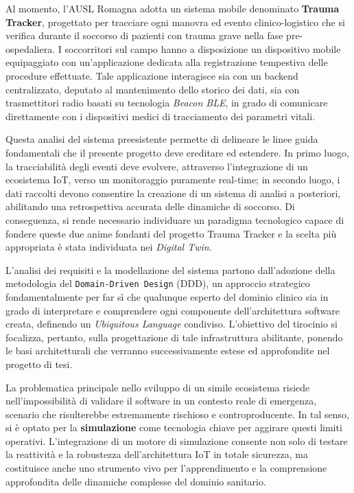 \documentclass[12pt,a4paper,oneside]{article}
\begin{document}
Al momento, l'AUSL Romagna adotta un sistema mobile denominato 
\textbf{Trauma Tracker}, progettato per tracciare ogni manovra ed evento clinico-logistico 
che si verifica durante il soccorso di pazienti con trauma grave nella fase
pre-ospedaliera. I soccorritori sul campo hanno a disposizione un dispositivo
mobile equipaggiato con un'applicazione dedicata alla registrazione tempestiva
delle procedure effettuate. Tale applicazione interagisce sia con un backend
centralizzato, deputato al mantenimento dello storico dei dati, sia con
trasmettitori radio basati su tecnologia \textit{Beacon BLE}, in grado di
comunicare direttamente con i dispositivi medici di tracciamento dei parametri
vitali.

Questa analisi del sistema preesistente permette di delineare le linee
guida fondamentali che il presente progetto deve ereditare ed estendere. In primo
luogo, la tracciabilità degli eventi deve evolvere, attraverso l'integrazione
di un ecosistema IoT, verso un monitoraggio puramente real-time; in secondo
luogo, i dati raccolti devono consentire la creazione di un sistema di analisi
a posteriori, abilitando una retrospettiva accurata delle dinamiche di soccorso.
Di conseguenza, si rende necessario individuare un paradigma tecnologico capace
di fondere queste due anime fondanti del progetto Trauma Tracker e la scelta più
appropriata è stata individuata nei \textit{Digital Twin}.

L'analisi dei requisiti e la modellazione del sistema partono dall'adozione
della metodologia del \texttt{Domain-Driven Design} (DDD), un approccio strategico
fondamentalmente per far sì che qualunque esperto del dominio clinico sia
in grado di interpretare e comprendere ogni componente dell'architettura
software creata, definendo un \textit{Ubiquitous Language} condiviso.
L'obiettivo del tirocinio si focalizza, pertanto,
sulla progettazione di tale infrastruttura abilitante, ponendo le basi
architetturali che verranno successivamente estese ed
approfondite nel progetto di tesi.

La problematica principale nello sviluppo di un simile ecosistema risiede
nell'impossibilità di validare il software in un contesto reale di emergenza, 
scenario che risulterebbe estremamente rischioso e controproducente. In tal senso, 
si è optato per la \textbf{simulazione} come tecnologia chiave per aggirare questi 
limiti operativi. L'integrazione di un motore di simulazione consente non solo di 
testare la reattività e la robustezza dell'architettura IoT in totale sicurezza, 
ma costituisce anche uno strumento vivo per l'apprendimento e la comprensione 
approfondita delle dinamiche complesse del dominio sanitario.
\end{document}
